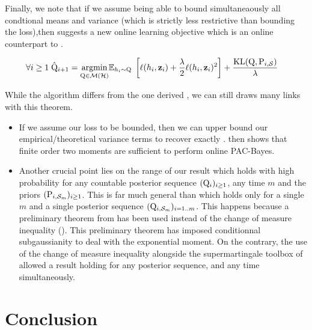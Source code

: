 Finally, we note that if we assume being able to bound simultaneaously all condtional means and variance (which is strictly less restrictive than bounding the loss),then   suggests a new online learning objective which is an online counterpart to .

\begin{align}
    \forall i\geq1\; \hat{\mathrm{Q}}_{i+1}&= \underset{\mathrm{Q}\in\mathcal{M}(\mathcal{H})}{\mathrm{argmin}} \mathbb{E}_{h_i\sim \mathrm{Q}} \; \left[\ell(h_i,\mathbf{z}_i)+ \frac{\lambda}{2}\ell(h_i,\mathbf{z}_i)^2\right] + \frac{\operatorname{KL}(\mathrm{Q}, \mathrm{P}_{i,\mathcal{S}})}{\lambda}
\end{align}

While the algorithm differs from the one derived , we can still draws many links with this theorem.

\begin{itemize}
  \item If we assume our loss to be bounded, then we can upper bound our empirical/theoretical variance terms to recover exactly .  then shows that finite order two moments are sufficient to perform online PAC-Bayes.
  \item Another crucial point lies on the range of our result which holds with high probability for any countable posterior sequence $(\mathrm{Q}_{i})_{i\geq 1}$, any time $m$ and the priors $(\mathrm{P}_{i,\mathcal{S}_m})_{i\geq 1}$.
  This is far much general than  which holds only for a single $m$ and a single posterior sequence $(\mathrm{Q}_{i,\mathcal{S}_m})_{i=1..m}$. This happens because a preliminary theorem from \citet{rivasplata2020pac} has been used instead of the change of measure inequality (). This preliminary theorem has imposed conditionnal subgaussianity to deal with the exponential moment. On the contrary, the use of the change of measure inequality alongside the supermartingale toolbox of  allowed a result holding for any posterior sequence, and any time simultaneously.
\end{itemize}






 \section{Conclusion}


